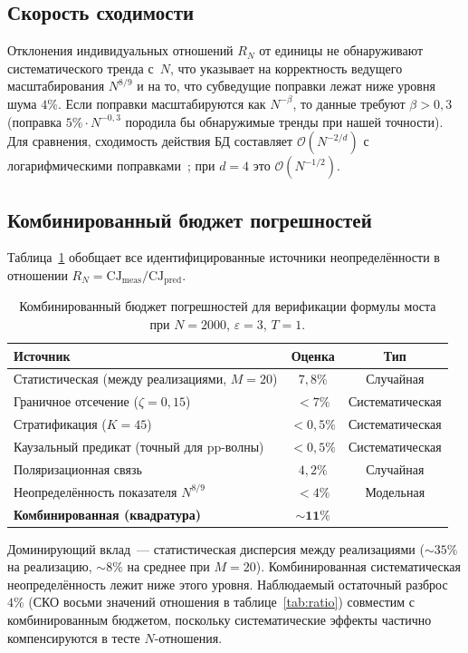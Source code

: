 \documentclass[12pt,a4paper]{article}
\theoremstyle{plain}
\theoremstyle{definition}
\theoremstyle{remark}
\newcommand{\order}{\mathcal{O}}
\newcommand{\CJ}{\mathrm{CJ}}
\begin{document}
\subsection{Скорость сходимости}
\label{sec:convergence}

Отклонения индивидуальных отношений $R_N$ от единицы не
обнаруживают систематического тренда с~$N$, что указывает
на корректность ведущего масштабирования $N^{8/9}$ и на то,
что субведущие поправки лежат ниже уровня шума $4\%$.  Если
поправки масштабируются как $N^{-\beta}$, то данные
требуют $\beta > 0{,}3$ (поправка
$5\% \cdot N^{-0{,}3}$ породила бы обнаружимые тренды при
нашей точности).  Для сравнения, сходимость действия БД
составляет $\order(N^{-2/d})$ с логарифмическими
поправками~\cite{Belenchia:2015}; при $d = 4$ это
$\order(N^{-1/2})$.

\subsection{Комбинированный бюджет погрешностей}
\label{sec:errorbudget}

Таблица~\ref{tab:errorbudget} обобщает все идентифицированные
источники неопределённости в отношении
$R_N = \CJ_{\mathrm{meas}}/\CJ_{\mathrm{pred}}$.

\begin{table}[ht]
\centering
\caption{Комбинированный бюджет погрешностей для верификации
формулы моста при $N = 2000$, $\varepsilon = 3$, $T = 1$.}
\label{tab:errorbudget}
\begin{tabular}{lcc}
\toprule
Источник & Оценка & Тип \\
\midrule
Статистическая (между реализациями, $M = 20$) & $7{,}8\%$ & Случайная \\
Граничное отсечение ($\zeta = 0{,}15$) & $< 7\%$ & Систематическая \\
Стратификация ($K = 45$) & $< 0{,}5\%$ & Систематическая \\
Каузальный предикат (точный для pp-волны) & $< 0{,}5\%$ & Систематическая \\
Поляризационная связь & $4{,}2\%$ & Случайная \\
Неопределённость показателя $N^{8/9}$ & $< 4\%$ & Модельная \\
\midrule
\textbf{Комбинированная (квадратура)} & $\mathbf{\sim 11\%}$ & \\
\bottomrule
\end{tabular}
\end{table}

Доминирующий вклад~--- статистическая дисперсия между
реализациями ($\sim 35\%$ на реализацию, $\sim 8\%$ на
среднее при $M = 20$).  Комбинированная систематическая
неопределённость лежит ниже этого уровня.  Наблюдаемый
остаточный разброс~$4\%$ (СКО восьми значений отношения
в таблице~\ref{tab:ratio}) совместим с комбинированным
бюджетом, поскольку систематические эффекты частично
компенсируются в тесте $N$-отношения.
\end{document}
